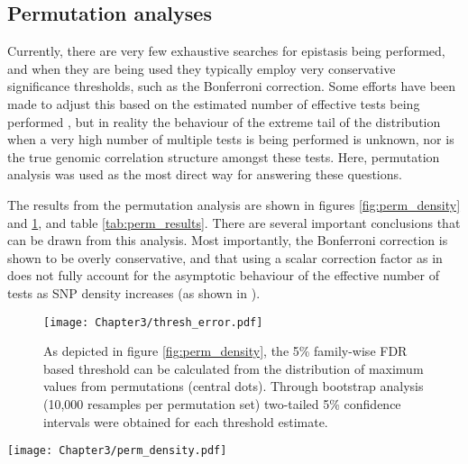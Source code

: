 \subsection{Permutation analyses}

Currently, there are very few exhaustive searches for epistasis being performed, and when they are being used they typically employ very conservative significance thresholds, such as the Bonferroni correction. Some efforts have been made to adjust this based on the estimated number of effective tests being performed \citep{Becker2011}, but in reality the behaviour of the extreme tail of the distribution when a very high number of multiple tests is being performed is unknown, nor is the true genomic correlation structure amongst these tests. Here, permutation analysis was used as the most direct way for answering these questions. 

The results from the permutation analysis are shown in figures \ref{fig:perm_density} and \ref{fig:thresh_error}, and table \ref{tab:perm_results}. There are several important conclusions that can be drawn from this analysis. Most importantly, the Bonferroni correction is shown to be overly conservative, and that using a scalar correction factor as in \citet{Becker2011} does not fully account for the asymptotic behaviour of the effective number of tests as SNP density increases (as shown in \citet{Dudbridge2008}).

\begin{figure}
\begin{center}
\texttt{[image: Chapter3/thresh\_error.pdf]}
\caption[Empirical estimates of 2D search thresholds]{As depicted in figure \ref{fig:perm_density}, the 5\% family-wise FDR based threshold can be calculated from the distribution of maximum values from permutations (central dots). Through bootstrap analysis (10,000 resamples per permutation set) two-tailed 5\% confidence intervals were obtained for each threshold estimate.}
\label{fig:thresh_error}
\end{center}
\end{figure}

\begin{sidewaysfigure}
\begin{center}
\texttt{[image: Chapter3/perm\_density.pdf]}
\caption[Distribution of test statistics from permutation analysis]{Hundreds of permutations (table \ref{tab:perm_results}) were performed for two dimensional scans under varying testing conditions of SNP chip density (rows of boxes), sample size (distribution fill colour), and test parameterisation (columns of boxes). Each curve is a smoothed density of the top test statistics retrieved from each permutation representing its testing conditions. Vertical lines represent $5\%$ family-wise false discovery thresholds calculated for different sample sizes (colours), or for the extant methods of the Becker correction (dots) \citep{Becker2011} or Bonferroni correction (dashes).}
\label{fig:perm_density}
\end{center}
\end{sidewaysfigure}

